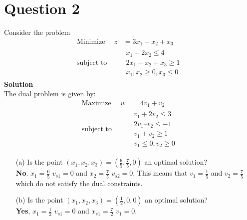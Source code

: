 \documentclass[12pt,a4paper]{article}
\begin{document}
\section*{Question 2}
Consider the problem
\begin{equation}
    \begin{aligned}
    \text{Minimize } \quad    z &= 3x_1 - x_2 + x_3 \\
    \text{subject to }\quad &
        \begin{array}{c}
            x_1 +2 x_2 \leq 4 \\
           2 x_1 - x_2 + x_3 \geq 1 \\
            x_1,x_2 \geq 0, x_3 \leq 0
        \end{array}
    \end{aligned}
    \label{eq:problem_2}
\end{equation}
	\textbf{Solution}\\
		The dual problem is given by:
		\begin{equation}
            \begin{aligned}
            \text{Maximize } \quad   w &= 4v_1 + v_2  \\
            \text{subject to }\quad &
                \begin{array}{c}
                    v_1 + 2v_2  \leq 3 \\
                   2v_1 – v_2 \leq -1 \\
                   v_1 + v_2 \geq 1\\
                    v_1 \leq 0, v_2  \geq 0
                \end{array}
            \end{aligned}
            \label{eq:problem_2}
        \end{equation}
\begin{enumerate}
	\item[(a)] Is the point $(x_1, x_2, x_3) = (\frac{6}{5}, \frac{7}{5}, 0)$ an optimal solution?\\
	   \textbf {No}. $x_1= \frac{6}{5}$ \xrightarrow{} $v_{s1} = 0$ and $x_2 = \frac{7}{5}$ \xrightarrow[]{} $v_{s2} = 0$. This means that $v_1 = \frac{1}{5}$ and $v_2 = \frac{7}{5}$ which do not satisfy the dual constraints.
	\item[(b)] Is the point $(x_1, x_2, x_3) = (\frac{1}{2}, 0, 0)$ an optimal solution?\\
	\textbf{Yes}, $x_1 = \frac{1}{2}$ \xrightarrow[]{}  $v_{s1} = 0$ and $x_{s1} =\frac{7}{2}$  \xrightarrow[]{}  $v_1 = 0$.
\end{enumerate}
\end{document}
